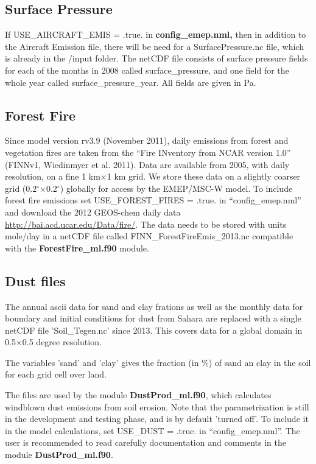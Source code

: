 \documentclass[a4paper,12pt]{report}
\begin{document}
\subsection{Surface Pressure}

If USE\_AIRCRAFT\_EMIS = .true. in { \bf config\_emep.nml,} then in addition to the Aircraft 
Emission file, there will be need for a SurfacePressure.nc file, which is already in the /input folder. 
The netCDF file consists of surface pressure fields for each of the months in 2008 called surface\_pressure, 
and one field for the whole year called surface\_pressure\_year. All fields are given in Pa. 

\subsection{Forest Fire}
\label{emisff}

Since model version rv3.9 (November 2011), daily emissions from forest and vegetation fires are taken from the “Fire INventory from NCAR version 1.0” (FINNv1,
Wiedinmyer et al. 2011). Data are available from 2005, with daily resolution, on a fine 1 km×1 km grid. We store these data on a slightly coarser grid (0.2$^\circ$×0.2$^\circ$) globally for access by the EMEP/MSC-W model. To include forest fire emissions set 
USE\_FOREST\_FIRES = .true. in ``config\_emep.nml'' and download the 
2012 GEOS-chem daily data \url{http://bai.acd.ucar.edu/Data/fire/}. The data needs to be stored with units mole/day in a netCDF file called FINN\_ForestFireEmis\_2013.nc 
compatible with the { \bf ForestFire\_ml.f90 } module. 

\subsection{Dust files}

The annual ascii data for sand and clay frations as well as the monthly data for boundary and initial conditions for dust from Sahara are replaced with a single netCDF file 'Soil\_Tegen.nc' since 2013.   This covers data for a global domain in 0.5$\times$0.5 degree resolution.  

The variables 'sand' and 'clay' gives the fraction (in \%)  
of sand an clay in the soil for each grid cell over land. 



The files are used by the module {\bf DustProd\_ml.f90}, which calculates windblown dust 
emissions from soil erosion. Note that the parametrization is still in the development and 
testing phase, and is by default 'turned off'. To include it in the model calculations, set 
USE\_DUST = .true. in ``config\_emep.nml''.
The user is recommended to read carefully documentation and
comments in the module {\bf DustProd\_ml.f90}.
\end{document}
